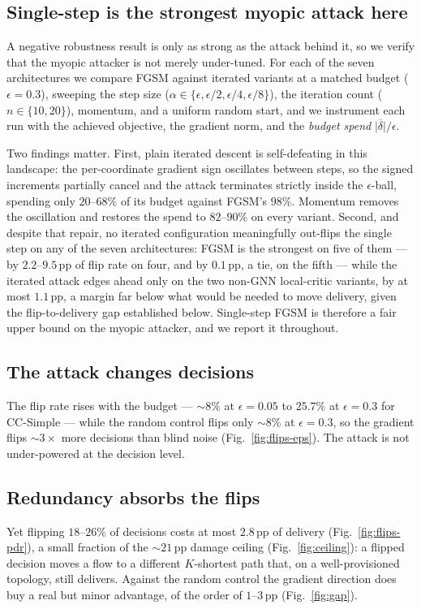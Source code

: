 \documentclass[10pt,journal,comsoc]{IEEEtran}
\begin{document}
\subsection{Single-step is the strongest myopic attack here}
\label{sec:iterated}
A negative robustness result is only as strong as the attack behind it, so we verify
that the myopic attacker is not merely under-tuned. For each of the seven architectures
we compare FGSM against iterated variants at a matched budget ($\epsilon{=}0.3$),
sweeping the step size
($\alpha\in\{\epsilon,\epsilon/2,\epsilon/4,\epsilon/8\}$), the iteration count
($n\in\{10,20\}$), momentum, and a uniform random start, and we instrument each run with
the achieved objective, the gradient norm, and the \emph{budget spend}
$\overline{|\delta|}/\epsilon$.

Two findings matter. First, plain iterated descent is self-defeating in this landscape:
the per-coordinate gradient sign oscillates between steps, so the signed increments
partially cancel and the attack terminates strictly inside the $\epsilon$-ball, spending
only $20$--$68\%$ of its budget against FGSM's $98\%$. Momentum removes the oscillation
and restores the spend to $82$--$90\%$ on every variant. Second, and despite that repair,
no iterated configuration meaningfully out-flips the single step on any of the seven
architectures: FGSM is the strongest on five of them --- by $2.2$--$9.5$\,pp of flip rate
on four, and by $0.1$\,pp, a tie, on the fifth --- while the iterated attack edges ahead
only on the two non-GNN local-critic variants, by at most $1.1$\,pp, a margin far below
what would be needed to move delivery, given the flip-to-delivery gap established below. Single-step FGSM is therefore a fair upper bound on the myopic
attacker, and we report it throughout.

\subsection{The attack changes decisions}
The flip rate rises with the budget --- ${\sim}8\%$ at $\epsilon{=}0.05$ to $25.7\%$ at
$\epsilon{=}0.3$ for CC-Simple --- while the random control flips only ${\sim}8\%$ at
$\epsilon{=}0.3$, so the gradient flips ${\sim}3\times$ more decisions than blind noise
(Fig.~\ref{fig:flips-eps}). The attack is not under-powered at the decision level.

\subsection{Redundancy absorbs the flips}
Yet flipping $18$--$26\%$ of decisions costs at most $2.8$\,pp of delivery
(Fig.~\ref{fig:flips-pdr}), a small fraction of the $\sim$$21$\,pp damage ceiling
(Fig.~\ref{fig:ceiling}): a flipped decision moves a flow to a different $K$-shortest
path that, on a well-provisioned topology, still delivers. Against the random control the gradient direction does buy a real but minor advantage,
of the order of $1$--$3$\,pp (Fig.~\ref{fig:gap}).
\end{document}
